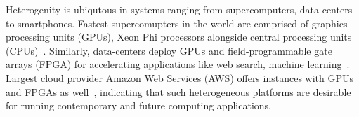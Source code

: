 






%

Heterogenity is ubiqutous in systems ranging from supercomputers, data-centers
to smartphones. Fastest supercomupters in the world are comprised of graphics
processing units (GPUs), Xeon Phi processors alongside central processing units
(CPUs)~\cite{XXXXX}. Similarly, data-centers deploy GPUs and field-programmable
gate arrays (FPGA) for accelerating applications like web search, machine
learning~\cite{XXXXX}. Largest cloud provider Amazon Web Services (AWS) offers
instances with GPUs and FPGAs as well~\cite{XXXXX}, indicating that such
heterogeneous platforms are desirable for running contemporary and future
computing applications. 

